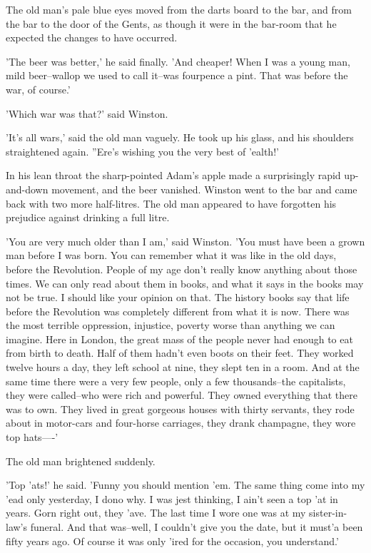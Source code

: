 \documentclass{article}
\begin{document}
The old man's pale blue eyes moved from the darts board to the bar, and
from the bar to the door of the Gents, as though it were in the bar-room
that he expected the changes to have occurred.

'The beer was better,' he said finally. 'And cheaper! When I was a young
man, mild beer--wallop we used to call it--was fourpence a pint. That was
before the war, of course.'

'Which war was that?' said Winston.

'It's all wars,' said the old man vaguely. He took up his glass, and his
shoulders straightened again. ''Ere's wishing you the very best of 'ealth!'

In his lean throat the sharp-pointed Adam's apple made a surprisingly rapid
up-and-down movement, and the beer vanished. Winston went to the bar and
came back with two more half-litres. The old man appeared to have forgotten
his prejudice against drinking a full litre.

'You are very much older than I am,' said Winston. 'You must have been a
grown man before I was born. You can remember what it was like in the old
days, before the Revolution. People of my age don't really know anything
about those times. We can only read about them in books, and what it says
in the books may not be true. I should like your opinion on that. The
history books say that life before the Revolution was completely different
from what it is now. There was the most terrible oppression, injustice,
poverty worse than anything we can imagine. Here in London, the great mass
of the people never had enough to eat from birth to death. Half of them
hadn't even boots on their feet. They worked twelve hours a day, they left
school at nine, they slept ten in a room. And at the same time there were
a very few people, only a few thousands--the capitalists, they were
called--who were rich and powerful. They owned everything that there was
to own. They lived in great gorgeous houses with thirty servants, they
rode about in motor-cars and four-horse carriages, they drank champagne,
they wore top hats----'

The old man brightened suddenly.

'Top 'ats!' he said. 'Funny you should mention 'em. The same thing come
into my 'ead only yesterday, I dono why. I was jest thinking, I ain't seen
a top 'at in years. Gorn right out, they 'ave. The last time I wore one
was at my sister-in-law's funeral. And that was--well, I couldn't give you
the date, but it must'a been fifty years ago. Of course it was only 'ired
for the occasion, you understand.'
\end{document}
